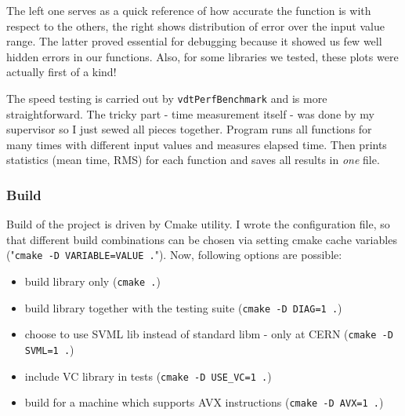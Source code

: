 \documentclass[oneside,10pt,a4paper]{article}
\newcommand{\beI}{\begin{itemize}}
\newcommand{\enI}{\end{itemize}}
\begin{document}
The left one serves as a quick reference of how accurate the function is with respect to the others, the right shows distribution of error over the input value range. The latter proved essential for debugging because it showed us few well hidden errors in our functions. Also, for some libraries we tested, these plots were actually first of a kind!

The speed testing is carried out by {\tt vdtPerfBenchmark} and is more straightforward. The tricky part - time measurement itself - was done by my supervisor so I just sewed all pieces together. Program runs all functions for many times with different input values and measures elapsed time. Then prints statistics (mean time, RMS) for each function and saves all results in \emph{one} file.

\subsubsection{Build}
Build of the project is driven by Cmake utility. I wrote the configuration file, so that different build combinations can be chosen via setting cmake cache variables ("{\tt cmake -D VARIABLE=VALUE .}"). Now, following options are possible:
\beI
 \item build library only ({\tt cmake .})
 \item build library together with the testing suite ({\tt cmake -D DIAG=1 .})
 \item choose to use SVML lib instead of standard libm - only at CERN ({\tt cmake -D SVML=1 .})
 \item include VC library in tests ({\tt cmake -D USE\_VC=1 .})
 \item build for a machine which supports AVX instructions ({\tt cmake -D AVX=1 .})
\enI
\end{document}
